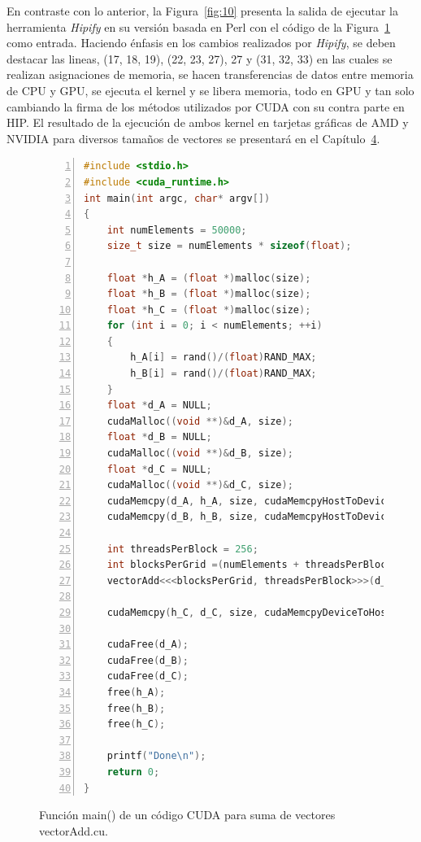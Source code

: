 En contraste con lo anterior, la Figura~\ref{fig:10} presenta la salida de ejecutar la herramienta \textit{Hipify} en su versión basada en Perl con el código de la Figura~\ref{fig:9} como entrada.
Haciendo énfasis en los cambios realizados por \textit{Hipify}, se deben destacar las lineas, (17, 18, 19), (22, 23, 27), 27 y (31, 32, 33) en las cuales se realizan asignaciones de memoria, se hacen transferencias de datos entre memoria de CPU y GPU, se ejecuta el kernel y se libera memoria, todo en GPU y tan solo cambiando la firma de los métodos utilizados por CUDA con su contra parte en HIP. 
El resultado de la ejecución de ambos kernel en tarjetas gráficas de AMD y NVIDIA para diversos tamaños de vectores se presentará en el Capítulo~\hyperref[sec:4]{4}.


\newpage

\begin{figure}[h!]
\centering
\begin{lstlisting}[language=C++, frame=single, breaklines=true,style=CudaStyle, basicstyle=\footnotesize, numbers=left]
#include <stdio.h>
#include <cuda_runtime.h>
int main(int argc, char* argv[])
{
    int numElements = 50000;
    size_t size = numElements * sizeof(float);
    
    float *h_A = (float *)malloc(size);
    float *h_B = (float *)malloc(size);
    float *h_C = (float *)malloc(size);
    for (int i = 0; i < numElements; ++i)
    {
        h_A[i] = rand()/(float)RAND_MAX;
        h_B[i] = rand()/(float)RAND_MAX;
    }
    float *d_A = NULL;
    cudaMalloc((void **)&d_A, size);
    float *d_B = NULL;
    cudaMalloc((void **)&d_B, size);
    float *d_C = NULL;
    cudaMalloc((void **)&d_C, size);
    cudaMemcpy(d_A, h_A, size, cudaMemcpyHostToDevice);
    cudaMemcpy(d_B, h_B, size, cudaMemcpyHostToDevice);

    int threadsPerBlock = 256;
    int blocksPerGrid =(numElements + threadsPerBlock - 1) / threadsPerBlock;
    vectorAdd<<<blocksPerGrid, threadsPerBlock>>>(d_A, d_B, d_C, numElements);

    cudaMemcpy(h_C, d_C, size, cudaMemcpyDeviceToHost);

    cudaFree(d_A);
    cudaFree(d_B);
    cudaFree(d_C);
    free(h_A);
    free(h_B);
    free(h_C);

    printf("Done\n");
    return 0;
}
\end{lstlisting}
\caption{Función main()  de un código CUDA para suma de vectores vectorAdd.cu.}
\label{fig:9}
\end{figure}

